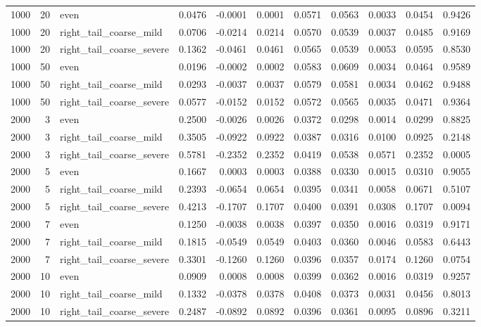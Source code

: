 \begin{table}[!h]
{\begin{tabular}[t]{rrlrrrrrrrr}
1000 & 20 & even & 0.0476 & -0.0001 & 0.0001 & 0.0571 & 0.0563 & 0.0033 & 0.0454 & 0.9426\\
1000 & 20 & right\_tail\_coarse\_mild & 0.0706 & -0.0214 & 0.0214 & 0.0570 & 0.0539 & 0.0037 & 0.0485 & 0.9169\\
1000 & 20 & right\_tail\_coarse\_severe & 0.1362 & -0.0461 & 0.0461 & 0.0565 & 0.0539 & 0.0053 & 0.0595 & 0.8530\\
1000 & 50 & even & 0.0196 & -0.0002 & 0.0002 & 0.0583 & 0.0609 & 0.0034 & 0.0464 & 0.9589\\
1000 & 50 & right\_tail\_coarse\_mild & 0.0293 & -0.0037 & 0.0037 & 0.0579 & 0.0581 & 0.0034 & 0.0462 & 0.9488\\
1000 & 50 & right\_tail\_coarse\_severe & 0.0577 & -0.0152 & 0.0152 & 0.0572 & 0.0565 & 0.0035 & 0.0471 & 0.9364\\
2000 & 3 & even & 0.2500 & -0.0026 & 0.0026 & 0.0372 & 0.0298 & 0.0014 & 0.0299 & 0.8825\\
2000 & 3 & right\_tail\_coarse\_mild & 0.3505 & -0.0922 & 0.0922 & 0.0387 & 0.0316 & 0.0100 & 0.0925 & 0.2148\\
2000 & 3 & right\_tail\_coarse\_severe & 0.5781 & -0.2352 & 0.2352 & 0.0419 & 0.0538 & 0.0571 & 0.2352 & 0.0005\\
2000 & 5 & even & 0.1667 & 0.0003 & 0.0003 & 0.0388 & 0.0330 & 0.0015 & 0.0310 & 0.9055\\
2000 & 5 & right\_tail\_coarse\_mild & 0.2393 & -0.0654 & 0.0654 & 0.0395 & 0.0341 & 0.0058 & 0.0671 & 0.5107\\
2000 & 5 & right\_tail\_coarse\_severe & 0.4213 & -0.1707 & 0.1707 & 0.0400 & 0.0391 & 0.0308 & 0.1707 & 0.0094\\
2000 & 7 & even & 0.1250 & -0.0038 & 0.0038 & 0.0397 & 0.0350 & 0.0016 & 0.0319 & 0.9171\\
2000 & 7 & right\_tail\_coarse\_mild & 0.1815 & -0.0549 & 0.0549 & 0.0403 & 0.0360 & 0.0046 & 0.0583 & 0.6443\\
2000 & 7 & right\_tail\_coarse\_severe & 0.3301 & -0.1260 & 0.1260 & 0.0396 & 0.0357 & 0.0174 & 0.1260 & 0.0754\\
2000 & 10 & even & 0.0909 & 0.0008 & 0.0008 & 0.0399 & 0.0362 & 0.0016 & 0.0319 & 0.9257\\
2000 & 10 & right\_tail\_coarse\_mild & 0.1332 & -0.0378 & 0.0378 & 0.0408 & 0.0373 & 0.0031 & 0.0456 & 0.8013\\
2000 & 10 & right\_tail\_coarse\_severe & 0.2487 & -0.0892 & 0.0892 & 0.0396 & 0.0361 & 0.0095 & 0.0896 & 0.3211\\

\end{tabular}}
\end{table}
